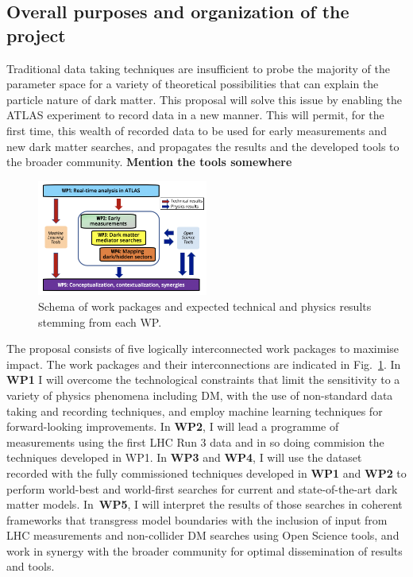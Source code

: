 \documentclass[11pt,a4paper]{article}
\begin{document}

\subsection{Overall purposes and organization of the project} 

Traditional data taking techniques are insufficient to probe the majority of the parameter space for a variety of theoretical possibilities that can explain the particle nature of dark matter. This proposal will solve this issue by enabling the ATLAS experiment to record data in a new manner. This will permit, for the first time, this wealth of recorded data to be used for early measurements and new dark matter searches, and propagates the results and the developed tools to the broader community. \textbf{Mention the tools somewhere}

\begin{figure} 
\begin{center}
\includegraphics[width=0.5\textwidth]{figs/WPs}
\caption{\label{fig:WPs} \small Schema of work packages and expected technical and physics results stemming from each WP.}
\end{center}
\end{figure}

The proposal consists of five logically interconnected work packages to maximise impact. The work packages and their interconnections are indicated in Fig.~\ref{fig:WPs}. In \textbf{WP1} I will overcome the technological constraints that limit the sensitivity to a variety of physics phenomena including DM, with the use of non-standard data taking and recording techniques, and employ machine learning techniques for forward-looking improvements. In \textbf{WP2}, I will lead a programme of measurements using the first LHC Run 3 data and in so doing commision the techniques developed in WP1. In \textbf{WP3} and \textbf{WP4}, I will use the dataset recorded with the fully commissioned techniques developed in \textbf{WP1} and \textbf{WP2} to perform world-best and world-first searches for current and state-of-the-art dark matter models. In~\textbf{WP5}, I will interpret the results of those searches in coherent frameworks that transgress model boundaries with the inclusion of input from LHC measurements and non-collider DM searches using Open Science tools, and work in synergy with the broader community for optimal dissemination of results and tools. 
\medskip
\end{document}
